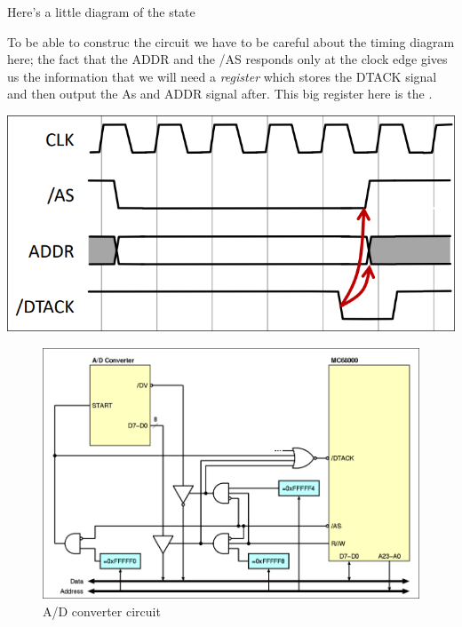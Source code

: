 Here's a little diagram of the state
\begin{center}
	    
	

\end{center}

To be able to construc the circuit we have to be careful about the timing diagram here; the fact that the ADDR and the /AS responds only at the clock edge gives us the information that we will need a \textit{register} which stores the DTACK signal and then output the As and ADDR signal after. This big register here is the .
\begin{center}
\includegraphics[scale=0.25]{screenshots/2025-10-22_8.png}
\end{center}
	\begin{figure}[h!]
	    \centering
\includegraphics[scale=0.3]{screenshots/2025-10-22_9.png}
\caption{A/D converter circuit}
	\end{figure}
	
